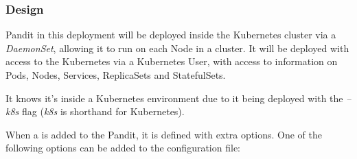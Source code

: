 \documentclass[a4paper,12pt]{report}
\begin{document}
\subsubsection{Design}

Pandit in this deployment will be deployed inside the Kubernetes cluster via a \textit{DaemonSet}, allowing it to run on each Node in a cluster. 
It will be deployed with access to the Kubernetes via a Kubernetes User, with access to information on Pods, Nodes, Services, ReplicaSets and StatefulSets.

It knows it's inside a Kubernetes environment due to it being deployed with the \textit{--k8s} flag (\textit{k8s} is shorthand for Kubernetes).

When a \textit{} is added to the Pandit, it is defined with extra options. One of the following options can be added to the configuration file:
\end{document}
